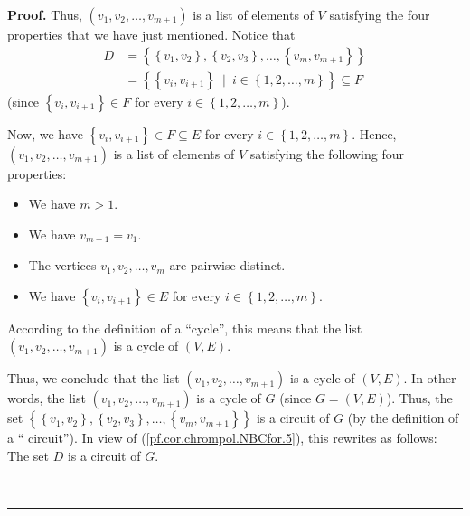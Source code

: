 \documentclass[numbers=enddot,12pt,final,onecolumn,notitlepage]{scrartcl}%
\theoremstyle{definition}
\newenvironment{proof}[1][Proof]{\noindent\textbf{#1.} }{\ \rule{0.5em}{0.5em}}
\newenvironment{verlong}{}{}
\begin{document}
\begin{verlong}
\begin{proof}
Thus, $\left(  v_{1},v_{2},\ldots,v_{m+1}\right)  $ is a list of elements of
$V$ satisfying the four properties that we have just mentioned. Notice that%
\begin{align*}
D  &  =\left\{  \left\{  v_{1},v_{2}\right\}  ,\left\{  v_{2},v_{3}\right\}
,\ldots,\left\{  v_{m},v_{m+1}\right\}  \right\} \\
&  =\left\{  \left\{  v_{i},v_{i+1}\right\}  \ \mid\ i\in\left\{
1,2,\ldots,m\right\}  \right\}  \subseteq F
\end{align*}
(since $\left\{  v_{i},v_{i+1}\right\}  \in F$ for every $i\in\left\{
1,2,\ldots,m\right\}  $).

Now, we have $\left\{  v_{i},v_{i+1}\right\}  \in F\subseteq E$ for every
$i\in\left\{  1,2,\ldots,m\right\}  $. Hence, $\left(  v_{1},v_{2}%
,\ldots,v_{m+1}\right)  $ is a list of elements of $V$ satisfying the
following four properties:

\begin{itemize}
\item We have $m>1$.

\item We have $v_{m+1}=v_{1}$.

\item The vertices $v_{1},v_{2},\ldots,v_{m}$ are pairwise distinct.

\item We have $\left\{  v_{i},v_{i+1}\right\}  \in E$ for every $i\in\left\{
1,2,\ldots,m\right\}  $.
\end{itemize}

According to the definition of a \textquotedblleft cycle\textquotedblright,
this means that the list $\left(  v_{1},v_{2},\ldots,v_{m+1}\right)  $ is a
cycle of $\left(  V,E\right)  $.

Thus, we conclude that the list $\left(  v_{1},v_{2},\ldots,v_{m+1}\right)  $
is a cycle of $\left(  V,E\right)  $. In other words, the list $\left(
v_{1},v_{2},\ldots,v_{m+1}\right)  $ is a cycle of $G$ (since $G=\left(
V,E\right)  $). Thus, the set $\left\{  \left\{  v_{1},v_{2}\right\}
,\left\{  v_{2},v_{3}\right\}  ,\ldots,\left\{  v_{m},v_{m+1}\right\}
\right\}  $ is a circuit of $G$ (by the definition of a \textquotedblleft
circuit\textquotedblright). In view of (\ref{pf.cor.chrompol.NBCfor.5}), this
rewrites as follows: The set $D$ is a circuit of $G$.


\end{proof}
\end{verlong}
\end{document}
